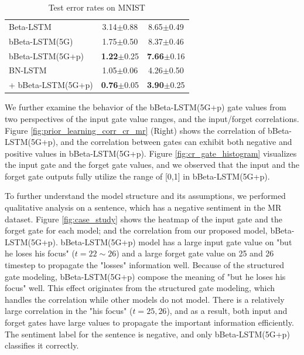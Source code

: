 \documentclass[letterpaper]{article} %
\begin{document}
\begin{table}[h!]
\begin{minipage}{.35\linewidth}
\begin{tabular}{lcc}
			\midrule
			Beta-LSTM   & 3.14$\pm$0.88 & 8.65$\pm$0.49 \\
			bBeta-LSTM(5G) & 1.75$\pm$0.50 & 8.37$\pm$0.46 \\
			bBeta-LSTM(5G+p) & \textbf{1.22}$\pm$0.25 & \textbf{7.66}$\pm$0.16 \\
			\midrule
			BN-LSTM & 1.05$\pm$0.06 & 4.26$\pm$0.50 \\
			\hspace{1pt} + bBeta-LSTM(5G+p) & \textbf{0.76}$\pm$0.05 & \textbf{3.90}$\pm$0.25 \\
			\bottomrule
		\end{tabular}
		\centering
		\caption{Test error rates on MNIST}
		\label{table:mnist}
	\end{minipage}
\end{table}
%
We further examine the behavior of the bBeta-LSTM(5G+p) gate values from two perspectives of the input gate value ranges, and the input/forget correlations.
Figure \ref{fig:prior_learning_corr_cr_mr} (Right) shows the correlation of bBeta-LSTM(5G+p), and the correlation between gates can exhibit both negative and positive values in bBeta-LSTM(5G+p).
Figure \ref{fig:cr_gate_histogram} visualizes the input gate and the forget gate values, and we observed that the input and the forget gate outputs fully utilize the range of [0,1] in bBeta-LSTM(5G+p).

To further understand the model structure and its assumptions, we performed qualitative analysis on a sentence, which has a negative sentiment in the MR dataset.
Figure \ref{fig:case_study} shows the heatmap of the input gate and the forget gate for each model; and the correlation from our proposed model, bBeta-LSTM(5G+p). bBeta-LSTM(5G+p) model has a large input gate value on "but he loses his focus" ($t=22\sim26$) and a large forget gate value on 25 and 26 timestep to propagate the "losses" information well. Because of the structured gate modeling, bBeta-LSTM(5G+p) compose the meaning of "but he loses his focus" well. This effect originates from the structured gate modeling, which handles the correlation while other models do not model.
There is a relatively large correlation in the "his focus" ($t=25,26$), and as a result, both input and forget gates have large values to propagate the important information efficiently. The sentiment label for the sentence is negative, and only bBeta-LSTM(5G+p) classifies it correctly.
\end{document}
